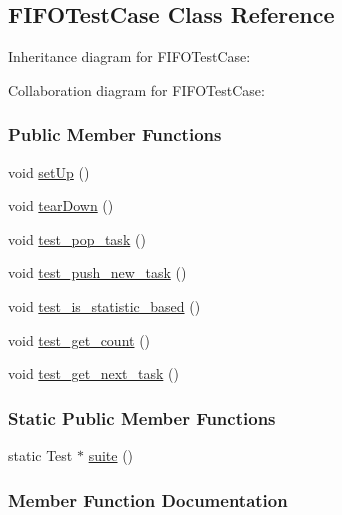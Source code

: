 \hypertarget{a00017}{}\subsection{F\+I\+F\+O\+Test\+Case Class Reference}
\label{a00017}


Inheritance diagram for F\+I\+F\+O\+Test\+Case\+:


Collaboration diagram for F\+I\+F\+O\+Test\+Case\+:
\subsubsection*{Public Member Functions}
\begin{DoxyCompactItemize}
\item 
void \hyperlink{a00017_a495f68d6fc339a408d0fba28cc50ebc6}{set\+Up} ()
\item 
void \hyperlink{a00017_a584d644de7aa5dcb2027b3f4ea8da683}{tear\+Down} ()
\item 
void \hyperlink{a00017_adef49d5e56109bf1ed0f23210c57d761}{test\+\_\+pop\+\_\+task} ()
\item 
void \hyperlink{a00017_a749871e27042f119be009b27bc082136}{test\+\_\+push\+\_\+new\+\_\+task} ()
\item 
void \hyperlink{a00017_a53bda2037e4df5fd0be76a8485766b27}{test\+\_\+is\+\_\+statistic\+\_\+based} ()
\item 
void \hyperlink{a00017_a0e5bf8bbab4e77bce4092bc0b3c5192b}{test\+\_\+get\+\_\+count} ()
\item 
void \hyperlink{a00017_a8f870e880a9d9092042ac5f7d55a120a}{test\+\_\+get\+\_\+next\+\_\+task} ()
\end{DoxyCompactItemize}
\subsubsection*{Static Public Member Functions}
\begin{DoxyCompactItemize}
\item 
static Test $\ast$ \hyperlink{a00017_ad80f96dab4623dcaf147db1582af9574}{suite} ()
\end{DoxyCompactItemize}


\subsubsection{Member Function Documentation}
\hypertarget{a00017_a495f68d6fc339a408d0fba28cc50ebc6}{}
